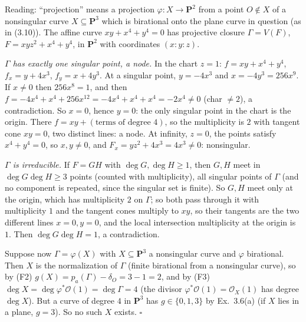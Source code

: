 \documentclass[11pt]{article}
\begin{document}
\pf
Reading: ``projection'' means a projection $\varphi:X\to\mathbf P^2$ from a point $O\notin X$ of a nonsingular curve $X\subseteq\mathbf P^3$ which is birational onto the plane curve in question (as in (3.10)). The affine curve $xy+x^4+y^4=0$ has projective closure $\Gamma=V(F)$, $F=xyz^2+x^4+y^4$, in $\mathbf P^2$ with coordinates $(x:y:z)$.

\emph{$\Gamma$ has exactly one singular point, a node.} In the chart $z=1$: $f=xy+x^4+y^4$, $f_x=y+4x^3$, $f_y=x+4y^3$. At a singular point, $y=-4x^3$ and $x=-4y^3=256x^9$. If $x\ne0$ then $256x^8=1$, and then $f=-4x^4+x^4+256x^{12}=-4x^4+x^4+x^4=-2x^4\ne0$ (char $\ne2$), a contradiction. So $x=0$, hence $y=0$: the only singular point in the chart is the origin. There $f=xy+(\text{terms of degree 4})$, so the multiplicity is $2$ with tangent cone $xy=0$, two distinct lines: a node. At infinity, $z=0$, the points satisfy $x^4+y^4=0$, so $x,y\ne0$, and $F_x=yz^2+4x^3=4x^3\ne0$: nonsingular.

\emph{$\Gamma$ is irreducible.} If $F=GH$ with $\deg G,\deg H\ge1$, then $G,H$ meet in $\deg G\deg H\ge3$ points (counted with multiplicity), all singular points of $\Gamma$ (and no component is repeated, since the singular set is finite). So $G,H$ meet only at the origin, which has multiplicity $2$ on $\Gamma$; so both pass through it with multiplicity $1$ and the tangent cones multiply to $xy$, so their tangents are the two different lines $x=0,y=0$, and the local intersection multiplicity at the origin is $1$. Then $\deg G\deg H=1$, a contradiction.

Suppose now $\Gamma=\varphi(X)$ with $X\subseteq\mathbf P^3$ a nonsingular curve and $\varphi$ birational. Then $X$ is the normalization of $\Gamma$ (finite birational from a nonsingular curve), so by (F2) $g(X)=p_a(\Gamma)-\delta_O=3-1=2$, and by (F3) $\deg X=\deg\varphi^*\mathcal O(1)=\deg\Gamma=4$ (the divisor $\varphi^*\mathcal O(1)=\mathcal O_X(1)$ has degree $\deg X$). But a curve of degree $4$ in $\mathbf P^3$ has $g\in\{0,1,3\}$ by Ex.~3.6(a) (if $X$ lies in a plane, $g=3$). So no such $X$ exists. \hfill$\square$
\end{document}
